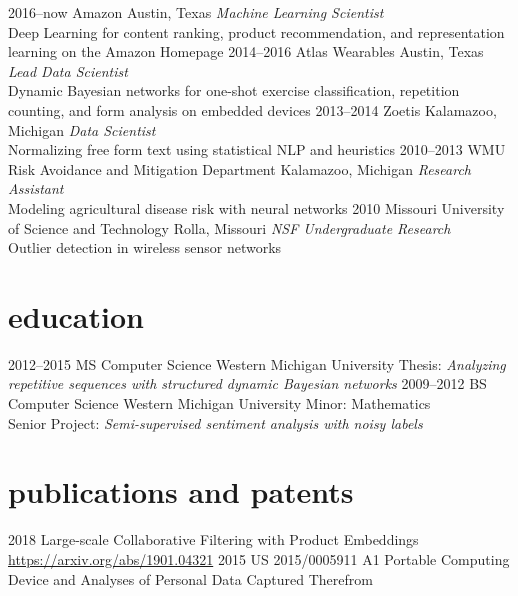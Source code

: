 \documentclass[print]{friggeri-cv}
\begin{document}
\begin{entrylist}
  \entry
    {2016--now}
    {Amazon}
    {Austin, Texas}
    {
      \emph{Machine Learning Scientist}\\
      Deep Learning for content ranking, product recommendation, and representation learning on the Amazon Homepage
    }
  \entry
    {2014--2016}
    {Atlas Wearables}
    {Austin, Texas}
    {
      \emph{Lead Data Scientist}\\
      Dynamic Bayesian networks for one-shot exercise classification, repetition counting, and form analysis on embedded devices
    }
  \entry
    {2013--2014}
    {Zoetis}
    {Kalamazoo, Michigan}
    {
      \emph{Data Scientist}\\
      Normalizing free form text using statistical NLP and heuristics
    }
  \entry
    {2010--2013}
    {WMU Risk Avoidance and Mitigation Department}
    {Kalamazoo, Michigan}
    {
      \emph{Research Assistant}\\
      Modeling agricultural disease risk with neural networks
    }
  \entry
    {2010}
    {Missouri University of Science and Technology}
    {Rolla, Missouri}
    {
      \emph{NSF Undergraduate Research}\\
      Outlier detection in wireless sensor networks
    }
\end{entrylist}

\section{education}

\begin{entrylist}
  \entry
    {2012--2015}
    {MS Computer Science}
    {Western Michigan University}
    {
      Thesis: \emph{Analyzing repetitive sequences with structured dynamic Bayesian networks}
    }
  \entry
    {2009--2012}
    {BS Computer Science}
    {Western Michigan University}
    {
      Minor: Mathematics\\
      Senior Project: \emph{Semi-supervised sentiment analysis with noisy labels}
    }
\end{entrylist}

\section{publications and patents}

\begin{entrylist}
  \entry
    {2018}
    {Large-scale Collaborative Filtering with Product Embeddings}
    {}
    {\href{https://arxiv.org/abs/1901.04321}{https://arxiv.org/abs/1901.04321}}
  \entry
    {2015}
    {US 2015/0005911 A1}
    {}
    {Portable Computing Device and Analyses of Personal Data Captured Therefrom}
\end{entrylist}
\end{document}
